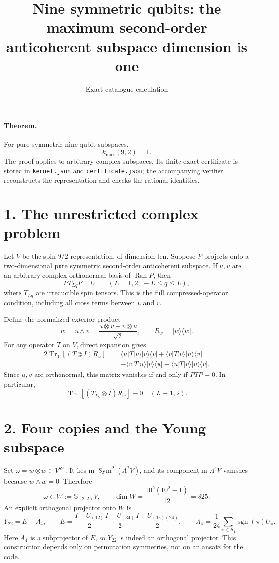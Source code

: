 \documentclass[11pt]{article}
\newcommand{\Tr}{\operatorname{Tr}}
\newcommand{\Sym}{\operatorname{Sym}}
\newcommand{\Ran}{\operatorname{Ran}}
\begin{document}
\title{Nine symmetric qubits: the maximum second-order anticoherent subspace dimension is one}
\author{Exact catalogue calculation}
\date{}
\maketitle
\paragraph{Theorem.}
For pure symmetric nine-qubit subspaces,
\[
 \boxed{k_{\max}(9,2)=1.}
\]
The proof applies to arbitrary complex subspaces. Its finite exact certificate is stored in \texttt{kernel.json} and \texttt{certificate.json}; the accompanying verifier reconstructs the representation and checks the rational identities.

\section*{1. The unrestricted complex problem}
Let $V$ be the spin-$9/2$ representation, of dimension ten. Suppose $P$ projects onto a two-dimensional pure symmetric second-order anticoherent subspace. If $u,v$ are an arbitrary complex orthonormal basis of $\Ran P$, then
\[
 PT_{Lq}P=0\qquad (L=1,2;\ -L\le q\le L),
\]
where $T_{Lq}$ are irreducible spin tensors. This is the full compressed-operator condition, including all cross terms between $u$ and $v$.

Define the normalized exterior product
\[
 w=u\wedge v=\frac{u\otimes v-v\otimes u}{\sqrt2},
 \qquad R_w=|w\rangle\langle w|.
\]
For any operator $T$ on $V$, direct expansion gives
\begin{align*}
2\Tr_1[(T\otimes I)R_w]
={}&\langle u|T|u\rangle|v\rangle\langle v|
+\langle v|T|v\rangle|u\rangle\langle u|\\
&-\langle v|T|u\rangle|v\rangle\langle u|
-\langle u|T|v\rangle|u\rangle\langle v|.
\end{align*}
Since $u,v$ are orthonormal, this matrix vanishes if and only if $PTP=0$. In particular,
\[
 \Tr_1[(T_{Lq}\otimes I)R_w]=0\quad(L=1,2).
\]

\section*{2. Four copies and the Young subspace}
Set $\omega=w\otimes w\in V^{\otimes4}$. It lies in
$\Sym^2(\Lambda^2V)$, and its component in $\Lambda^4V$ vanishes because
$w\wedge w=0$. Therefore
\[
 \omega\in W:=\mathbb S_{(2,2)}V,
 \qquad \dim W=\frac{10^2(10^2-1)}{12}=825.
\]
An explicit orthogonal projector onto $W$ is
\[
 Y_{22}=E-A_4,\qquad
 E=\frac{I-U_{(12)}}2\frac{I-U_{(34)}}2
       \frac{I+U_{(13)(24)}}2,
 \qquad A_4=\frac1{24}\sum_{\pi\in S_4}\operatorname{sgn}(\pi)U_\pi.
\]
Here $A_4$ is a subprojector of $E$, so $Y_{22}$ is indeed an orthogonal projector. This construction depends only on permutation symmetries, not on an ansatz for the code.
\end{document}
